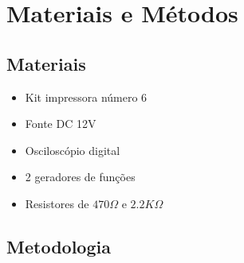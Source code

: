 \section{Materiais e Métodos}
\label{sec::materiais_metodos}
\subsection{Materiais}


\begin{itemize}
\item Kit impressora número 6
\item Fonte DC 12V
\item Osciloscópio digital
\item 2 geradores de funções
\item Resistores de $470\Omega$ e $2.2K\Omega$
\end{itemize}

\subsection{Metodologia}

